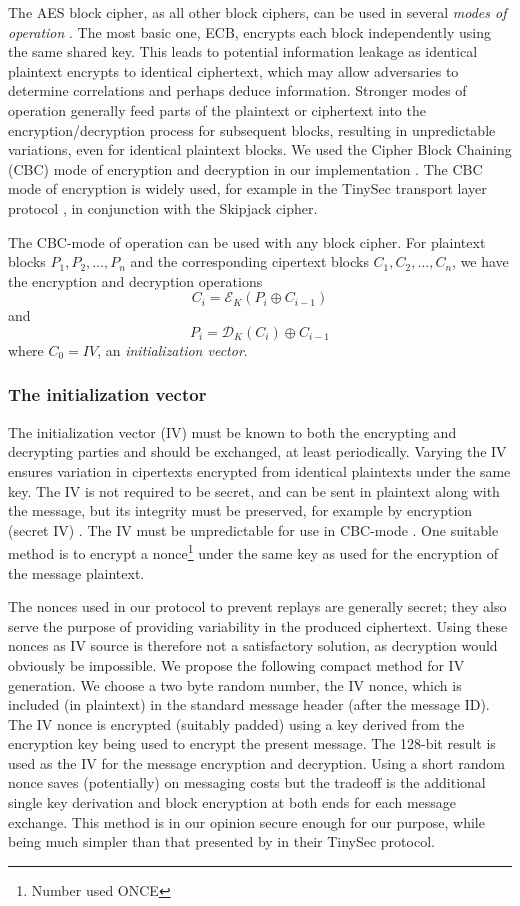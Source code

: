 The AES block cipher, as all other block ciphers, can be used in several \textit{modes of operation} . The most basic one, ECB, encrypts each block independently using the same shared key.  This leads to potential information leakage as identical plaintext encrypts to identical ciphertext, which may allow adversaries to determine correlations and perhaps deduce information. Stronger modes of operation generally feed parts of the plaintext or ciphertext into the encryption/decryption process for subsequent blocks, resulting in unpredictable variations, even for identical plaintext blocks. We used the Cipher Block Chaining (CBC) mode of encryption and decryption in our implementation . The CBC mode of encryption is widely used, for example in the TinySec transport layer protocol , in conjunction with the Skipjack cipher.

The CBC-mode of operation can be used with any block cipher. For plaintext blocks $P_1, P_2, \dots, P_n$ and the corresponding cipertext blocks $C_1, C_2, \dots, C_n$, we have the encryption and decryption operations
\[
C_i = \mathcal{E}_K(P_i \oplus C_{i-1})
\]
and 
\[
P_i = \mathcal{D}_K(C_i) \oplus C_{i-1}
\]
where $C_0=IV$, an \textit{initialization vector}. 

\subsubsection{The initialization vector}

The initialization vector (IV) must be known to both the encrypting and decrypting parties and should be exchanged, at least periodically. Varying the IV ensures variation in cipertexts encrypted from identical plaintexts under the same key. The IV is not required to be secret, and can be sent in plaintext along with the message, but its integrity must be preserved, for example by encryption (secret IV) . The IV must be unpredictable for use in CBC-mode . One suitable method is to encrypt a nonce\footnote{Number used ONCE} under the same key as used for the encryption of the message plaintext. 

The nonces used in our protocol to prevent replays are generally secret; they also serve the purpose of providing variability in the produced ciphertext. Using these nonces as IV source is therefore not a satisfactory solution, as decryption would obviously be impossible. 
%
We propose the following compact method for IV generation. We choose a two byte random number, the IV nonce, which is included (in plaintext) in the standard message header (after the message ID). The IV nonce is encrypted (suitably padded) using a key derived from the encryption key being used to encrypt the present message. The 128-bit result is used as the IV for the message encryption and decryption. Using a short random nonce saves (potentially) on messaging costs but the tradeoff is the additional single key derivation and block encryption at both ends for each message exchange.
%
This method is in our opinion secure enough for our purpose, while being much simpler than that presented by  in their TinySec protocol.


